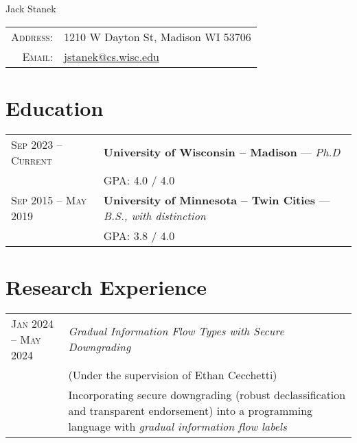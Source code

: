 \documentclass{article} %
\begin{document}
\pagestyle{empty} %

\begin{center}
    \par{\Huge Jack Stanek\bigskip\par} %

    \begin{tabular}{rl}
        \textsc{Address:} & 1210 W Dayton St, Madison WI 53706 \\
        \textsc{Email:} & \href{mailto:jstanek@cs.wisc.edu}{jstanek@cs.wisc.edu}
    \end{tabular}
\end{center}


\section{Education}

\begin{tabular}{R{4cm}p{11cm}}
    \textsc{Sep 2023 -- Current} & \textbf{University of Wisconsin -- Madison} --- \textit{Ph.D} \\
    & GPA: 4.0 / 4.0\\
    \textsc{Sep 2015 -- May 2019} & \textbf{University of Minnesota -- Twin Cities} --- \textit{B.S., with distinction} \\
    & GPA: 3.8 / 4.0\\
\end{tabular}


\section{Research Experience}

\begin{tabular}{R{4cm}p{11cm}}
     \textsc{Jan 2024 -- May 2024} & \textit{Gradual Information Flow Types with Secure Downgrading} \\
     & \footnotesize (Under the supervision of Ethan Cecchetti) \\
     & \small Incorporating secure downgrading (robust declassification and transparent endorsement) into a programming language with \emph{gradual information flow labels} \\
\end{tabular}
\end{document}
